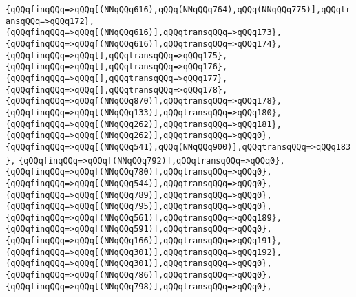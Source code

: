 \verb|{qQQqfinqQQq=>qQQq[(NNqQQq616),qQQq(NNqQQq764),qQQq(NNqQQq775)],qQQqtransqQQq=>qQQq172},|\newline
\verb|{qQQqfinqQQq=>qQQq[(NNqQQq616)],qQQqtransqQQq=>qQQq173},|\newline
\verb|{qQQqfinqQQq=>qQQq[(NNqQQq616)],qQQqtransqQQq=>qQQq174},|\newline
\verb|{qQQqfinqQQq=>qQQq[],qQQqtransqQQq=>qQQq175},|\newline
\verb|{qQQqfinqQQq=>qQQq[],qQQqtransqQQq=>qQQq176},|\newline
\verb|{qQQqfinqQQq=>qQQq[],qQQqtransqQQq=>qQQq177},|\newline
\verb|{qQQqfinqQQq=>qQQq[],qQQqtransqQQq=>qQQq178},|\newline
\verb|{qQQqfinqQQq=>qQQq[(NNqQQq870)],qQQqtransqQQq=>qQQq178},|\newline
\verb|{qQQqfinqQQq=>qQQq[(NNqQQq133)],qQQqtransqQQq=>qQQq180},|\newline
\verb|{qQQqfinqQQq=>qQQq[(NNqQQq262)],qQQqtransqQQq=>qQQq181},|\newline
\verb|{qQQqfinqQQq=>qQQq[(NNqQQq262)],qQQqtransqQQq=>qQQq0},|\newline
\verb|{qQQqfinqQQq=>qQQq[(NNqQQq541),qQQq(NNqQQq900)],qQQqtransqQQq=>qQQq183},|\newline
\verb|{qQQqfinqQQq=>qQQq[(NNqQQq792)],qQQqtransqQQq=>qQQq0},|\newline
\verb|{qQQqfinqQQq=>qQQq[(NNqQQq780)],qQQqtransqQQq=>qQQq0},|\newline
\verb|{qQQqfinqQQq=>qQQq[(NNqQQq544)],qQQqtransqQQq=>qQQq0},|\newline
\verb|{qQQqfinqQQq=>qQQq[(NNqQQq789)],qQQqtransqQQq=>qQQq0},|\newline
\verb|{qQQqfinqQQq=>qQQq[(NNqQQq795)],qQQqtransqQQq=>qQQq0},|\newline
\verb|{qQQqfinqQQq=>qQQq[(NNqQQq561)],qQQqtransqQQq=>qQQq189},|\newline
\verb|{qQQqfinqQQq=>qQQq[(NNqQQq591)],qQQqtransqQQq=>qQQq0},|\newline
\verb|{qQQqfinqQQq=>qQQq[(NNqQQq166)],qQQqtransqQQq=>qQQq191},|\newline
\verb|{qQQqfinqQQq=>qQQq[(NNqQQq301)],qQQqtransqQQq=>qQQq192},|\newline
\verb|{qQQqfinqQQq=>qQQq[(NNqQQq301)],qQQqtransqQQq=>qQQq0},|\newline
\verb|{qQQqfinqQQq=>qQQq[(NNqQQq786)],qQQqtransqQQq=>qQQq0},|\newline
\verb|{qQQqfinqQQq=>qQQq[(NNqQQq798)],qQQqtransqQQq=>qQQq0},|\newline
